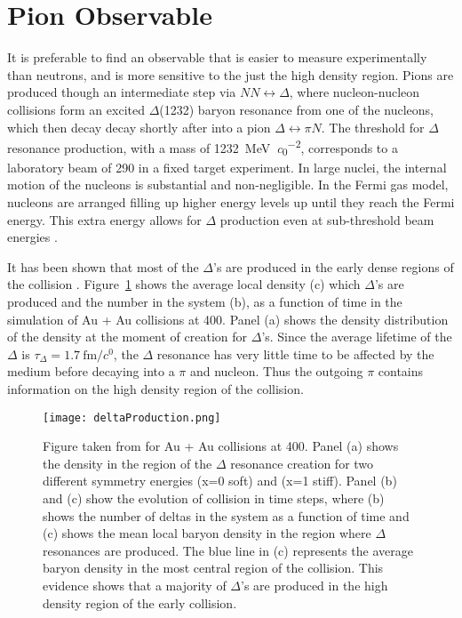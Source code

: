 \section{Pion Observable}
It is preferable to find an observable that is easier to measure experimentally than neutrons, and is more sensitive to the just the high density region. Pions are produced though an intermediate step via $ NN \leftrightarrow \Delta$, where nucleon-nucleon collisions form an excited $\Delta$(1232) baryon resonance from one of the nucleons, which then decay decay shortly after into a pion $\Delta \leftrightarrow \pi N$. The threshold for $\Delta$ resonance production, with a mass of \SI{1232}{\mega\electronvolt\per\clight\squared}, corresponds to a laboratory beam of \SI{290}{\MeVA} in a fixed target experiment. In large nuclei, the internal motion of the nucleons is substantial and non-negligible. In the Fermi gas model, nucleons are arranged filling up higher energy levels up until they reach the Fermi energy. This extra energy allows for $\Delta$ production even at sub-threshold beam energies \cite{fermiEnergy}.


It has been shown that most of the $\Delta$'s are produced in the early dense regions of the collision \cite{mingzhang}. Figure~\ref{fig:deltaProduction} shows the average local density (c) which $\Delta$'s are produced and the number in the system (b), as a function of time in the simulation of Au + Au collisions at \SI{400}{\MeVA}. Panel (a) shows the density distribution of the density at the moment of creation for $\Delta$'s. Since the average lifetime of the $\Delta$  is $\tau_{\Delta} = \SI{1.7}{\femto\metre\per\clight}$, the $\Delta$ resonance has very little time to be affected by the medium before decaying into a $\pi$ and nucleon. Thus the outgoing $\pi$ contains information on the high density region of the collision. 

\begin{figure}[!htb]
\centering
\texttt{[image: deltaProduction.png]}
\caption{Figure taken from \cite{mingzhang} for Au + Au collisions at \SI{400}{\MeVA}. Panel (a) shows the density in the region of the $\Delta$ resonance creation for two different symmetry energies (x=0 soft) and (x=1 stiff). Panel (b) and (c) show the evolution of collision in time steps, where (b) shows the number of deltas in the system as a function of time and (c) shows the mean local baryon density in the region where $\Delta$ resonances are produced. The blue line in (c) represents the average baryon density in the most central region of the collision. This evidence shows that a majority of $\Delta$'s are produced in the high density region of the early collision.}
\label{fig:deltaProduction}
\end{figure}

